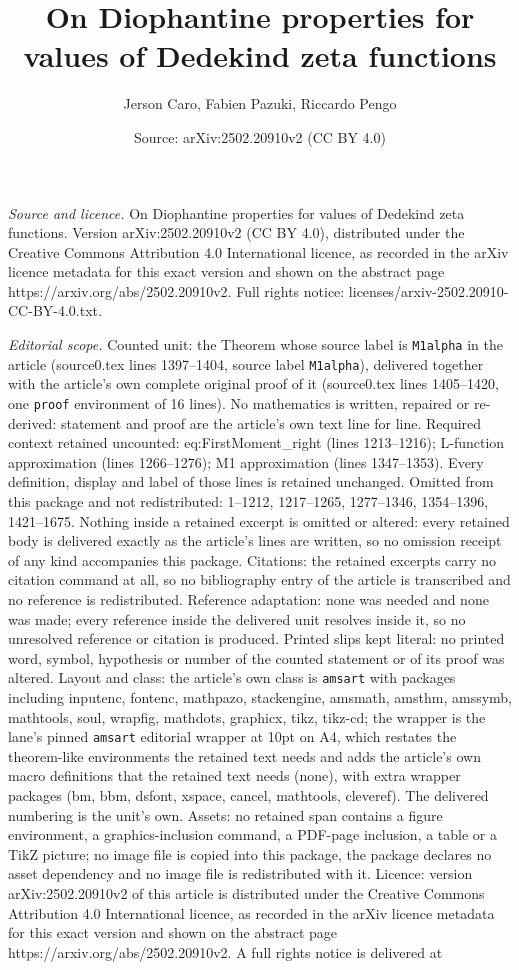 \documentclass[10pt,a4paper]{amsart}
\title[On Diophantine properties for values of Dedekind zeta functi]{On Diophantine properties for values of Dedekind zeta functions}
\author{Jerson Caro, Fabien Pazuki, Riccardo Pengo}
\date{Source: arXiv:2502.20910v2 (CC BY 4.0)}
\begin{document}
\maketitle

\noindent\emph{Source and licence.} On Diophantine properties for values of Dedekind zeta functions. Version arXiv:2502.20910v2 (CC BY 4.0), distributed under the Creative Commons Attribution 4.0 International licence, as recorded in the arXiv licence metadata for this exact version and shown on the abstract page https://arxiv.org/abs/2502.20910v2. Full rights notice: licenses/arxiv-2502.20910-CC-BY-4.0.txt.\par\smallskip

\noindent\textit{Editorial scope.} Counted unit: the Theorem whose source label is \texttt{M1alpha} in the article (source0.tex lines 1397--1404, source label \texttt{M1alpha}), delivered together with the article's own complete original proof of it (source0.tex lines 1405--1420, one \texttt{proof} environment of 16 lines). No mathematics is written, repaired or re-derived: statement and proof are the article's own text line for line. Required context retained uncounted: eq:FirstMoment\_right (lines 1213--1216); L-function approximation (lines 1266--1276); M1 approximation (lines 1347--1353). Every definition, display and label of those lines is retained unchanged. Omitted from this package and not redistributed: 1--1212, 1217--1265, 1277--1346, 1354--1396, 1421--1675. Nothing inside a retained excerpt is omitted or altered: every retained body is delivered exactly as the article's lines are written, so no omission receipt of any kind accompanies this package. Citations: the retained excerpts carry no citation command at all, so no bibliography entry of the article is transcribed and no reference is redistributed. Reference adaptation: none was needed and none was made; every reference inside the delivered unit resolves inside it, so no unresolved reference or citation is produced. Printed slips kept literal: no printed word, symbol, hypothesis or number of the counted statement or of its proof was altered. Layout and class: the article's own class is \texttt{amsart} with packages including inputenc, fontenc, mathpazo, stackengine, amsmath, amsthm, amssymb, mathtools, soul, wrapfig, mathdots, graphicx, tikz, tikz-cd; the wrapper is the lane's pinned \texttt{amsart} editorial wrapper at 10pt on A4, which restates the theorem-like environments the retained text needs and adds the article's own macro definitions that the retained text needs (none), with extra wrapper packages (bm, bbm, dsfont, xspace, cancel, mathtools, cleveref). The delivered numbering is the unit's own. Assets: no retained span contains a figure environment, a graphics-inclusion command, a PDF-page inclusion, a table or a TikZ picture; no image file is copied into this package, the package declares no asset dependency and no image file is redistributed with it. Licence: version arXiv:2502.20910v2 of this article is distributed under the Creative Commons Attribution 4.0 International licence, as recorded in the arXiv licence metadata for this exact version and shown on the abstract page https://arxiv.org/abs/2502.20910v2. A full rights notice is delivered at 
\end{document}
